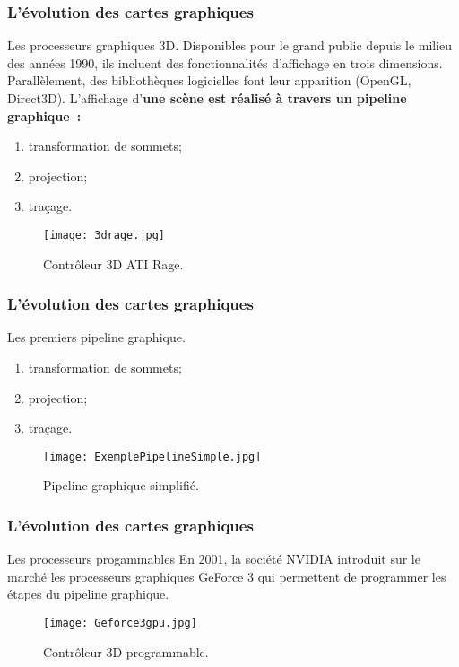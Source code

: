 \begin{frame}
  \frametitle{L'évolution des cartes graphiques}
\begin{block}{Les processeurs graphiques 3D.}
    Disponibles pour le grand public depuis le milieu des années 1990, ils incluent des fonctionnalités
    d'affichage en trois dimensions. Parallèlement, des bibliothèques logicielles font leur apparition
    (OpenGL, Direct3D). L'affichage d'\bf{une scène} est réalisé à travers un \bf{pipeline graphique}~: 
        
        \begin{enumerate}
            \item transformation de sommets;
            \item projection;
            \item traçage.
        \end{enumerate}
    
    \begin{figure}[htbp]
        \centering
       \texttt{[image: 3drage.jpg]} 
        \caption{Contrôleur 3D ATI Rage.}
        \label{fig:ati_rage}
    \end{figure}
\end{block}
\end{frame}

\begin{frame}
  \frametitle{L'évolution des cartes graphiques}
\begin{block}{Les premiers pipeline graphique.}

        \begin{enumerate}
            \item transformation de sommets;
            \item projection;
            \item traçage.
        \end{enumerate}

    \begin{figure}[htbp]
        \centering
       \texttt{[image: ExemplePipelineSimple.jpg]} 
        \caption{Pipeline graphique simplifié.}
        \label{fig:pipeline}
    \end{figure}
\end{block}
\end{frame}


\begin{frame}
  \frametitle{L'évolution des cartes graphiques}
\begin{block}{Les processeurs progammables}
    En 2001, la société NVIDIA introduit sur le marché les processeurs graphiques
    GeForce 3 qui permettent de programmer les étapes du pipeline graphique. 
    \begin{figure}[htbp]
        \centering
       \texttt{[image: Geforce3gpu.jpg]} 
        \caption{Contrôleur 3D programmable.}
        \label{fig:geforce3}
    \end{figure}
\end{block}
\end{frame}

